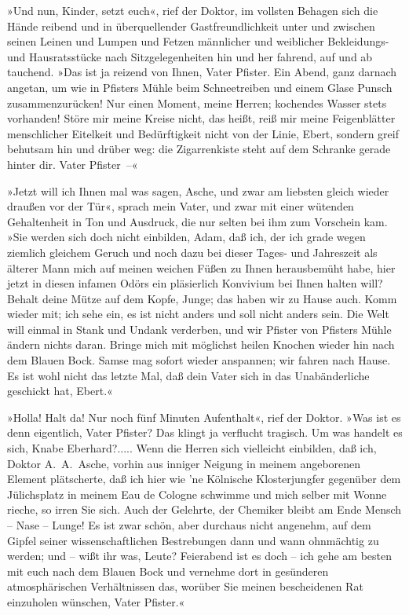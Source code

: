 »Und nun, Kinder, setzt euch«, rief der Doktor, im vollsten Behagen
sich die Hände reibend und in überquellender Gastfreundlichkeit
unter und zwischen seinen Leinen und Lumpen und Fetzen männlicher
und weiblicher Bekleidungs- und Hausratsstücke nach
Sitzgelegenheiten hin und her fahrend, auf und ab tauchend. »Das
ist ja reizend von Ihnen, Vater Pfister. Ein Abend, ganz darnach
angetan, um wie in Pfisters Mühle beim Schneetreiben und einem
Glase Punsch zusammenzurücken! Nur einen Moment, meine Herren;
kochendes Wasser stets vorhanden! Störe mir meine Kreise nicht, das
heißt, reiß mir meine Feigenblätter menschlicher Eitelkeit und
Bedürftigkeit nicht von der Linie, Ebert, sondern greif behutsam
hin und drüber weg: die Zigarrenkiste steht auf dem Schranke gerade
hinter dir. Vater Pfister~–«

»Jetzt will ich Ihnen mal was sagen, Asche, und zwar am liebsten
gleich wieder draußen vor der Tür«, sprach mein Vater, und zwar mit
einer wütenden Gehaltenheit in Ton und Ausdruck, die nur selten bei
ihm zum Vorschein kam. »Sie werden sich doch nicht einbilden, Adam,
daß ich, der ich grade wegen ziemlich gleichem Geruch und noch dazu
bei dieser Tages- und Jahreszeit als älterer Mann mich auf meinen
weichen Füßen zu Ihnen herausbemüht habe, hier jetzt in diesen
infamen Odörs ein pläsierlich Konvivium bei Ihnen halten will?
Behalt deine Mütze auf dem Kopfe, Junge; das haben wir zu Hause
auch. Komm wieder mit; ich sehe ein, es ist nicht anders und soll
nicht anders sein. Die Welt will einmal in Stank und Undank
verderben, und wir Pfister von Pfisters Mühle ändern nichts daran.
Bringe mich mit möglichst heilen Knochen wieder hin nach dem Blauen
Bock. Samse mag sofort wieder anspannen; wir fahren nach Hause. Es
ist wohl nicht das letzte Mal, daß dein Vater sich in das
Unabänderliche geschickt hat, Ebert.«

»Holla! Halt da! Nur noch fünf Minuten Aufenthalt«, rief der
Doktor. »Was ist es denn eigentlich, Vater Pfister? Das klingt ja
verflucht tragisch. Um was handelt es sich, Knabe Eberhard?.....
Wenn die Herren sich vielleicht einbilden, daß ich, Doktor
A.~A.~Asche, vorhin aus inniger Neigung in meinem angeborenen
Element plätscherte, daß ich hier wie 'ne Kölnische Klosterjungfer
gegenüber dem Jülichsplatz in meinem Eau de Cologne schwimme und
mich selber mit Wonne rieche, so irren Sie sich. Auch der Gelehrte,
der Chemiker bleibt am Ende Mensch – Nase – Lunge! Es ist zwar
schön, aber durchaus nicht angenehm, auf dem Gipfel seiner
wissenschaftlichen Bestrebungen dann und wann ohnmächtig zu werden;
und – wißt ihr was, Leute? Feierabend ist es doch – ich gehe am
besten mit euch nach dem Blauen Bock und vernehme dort in
gesünderen atmosphärischen Verhältnissen das, worüber Sie meinen
bescheidenen Rat einzuholen wünschen, Vater Pfister.«

